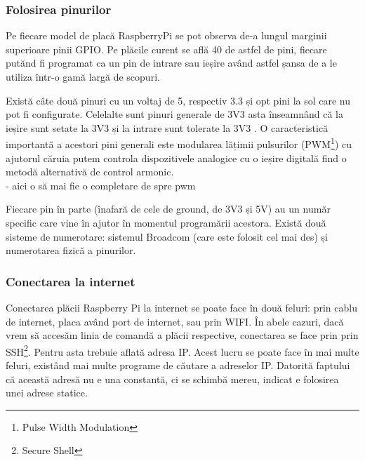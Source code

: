 \documentclass[../IoMusT.tex]{subfiles}
\begin{document}
\subsubsection{Folosirea pinurilor}
Pe fiecare model de placă RaspberryPi se pot observa de-a lungul marginii  superioare pinii GPIO. Pe plăcile curent se află 40 de astfel de pini, fiecare putănd fi programat ca un pin de intrare sau ieșire având astfel șansa de a le utiliza într-o gamă largă de scopuri.
\\
\par Există câte două pinuri cu un voltaj de 5, respectiv 3.3 și opt pini la sol care nu pot fi configurate. Celelalte sunt pinuri generale de 3V3 asta înseamnând că la ieșire sunt setate la 3V3 și la intrare sunt tolerate la 3V3 \cite{RaspPi}. O caracteristică importantă a acestori pini generali este modularea lățimii pulsurilor (PWM\footnote{Pulse Width Modulation}) cu ajutorul căruia putem controla dispozitivele analogice cu o ieșire digitală \cite{PWM} find o metodă alternativă de control armonic. 
\\
- aici o să mai fie o completare de spre pwm
\\
\par Fiecare pin în parte (înafară de cele de ground, de 3V3 și 5V) au un număr specific care vine în ajutor în momentul programării acestora. Există două sisteme de numerotare: sistemul Broadcom (care este folosit cel mai des) și numerotarea fizică a pinurilor.

\subsubsection{Conectarea la internet}
Conectarea plăcii Raspberry Pi la internet se poate face în două feluri: prin cablu de internet, placa având port de internet, sau prin WIFI. În abele cazuri, dacă vrem să accesăm linia de comandă a plăcii respective, conectarea se face prin prin SSH\footnote{Secure Shell}. Pentru asta trebuie aflată adresa IP. Acest lucru se poate face în mai multe feluri, existând mai multe programe de căutare a adreselor IP. Datorită faptului că această adresă nu e una constantă, ci se schimbă mereu, indicat e folosirea unei adrese statice.
\end{document}
